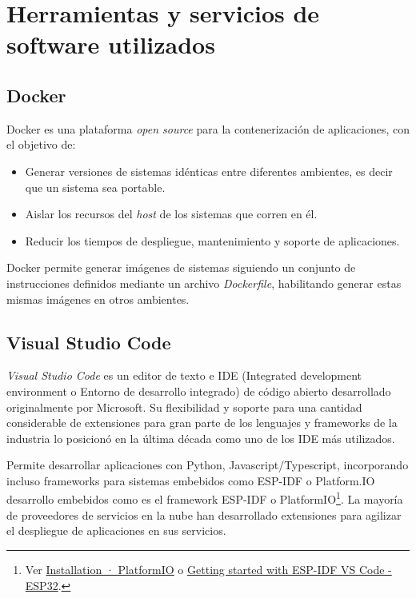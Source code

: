 \section{Herramientas y servicios de software utilizados}

\subsection{Docker}

Docker es una plataforma \textit{open source} para la contenerización de aplicaciones, con el objetivo de\citep{DOCKER:1}:
\begin{itemize}
	\item Generar versiones de sistemas idénticas entre diferentes ambientes, es decir que un sistema sea portable.
	\item Aislar los recursos del \textit{host} de los sistemas que corren en él.
	\item Reducir los tiempos de despliegue, mantenimiento y soporte de aplicaciones.
\end{itemize}

Docker permite generar imágenes de sistemas siguiendo un conjunto de instrucciones definidos mediante un archivo \textit{Dockerfile}, habilitando generar estas mismas imágenes en otros ambientes.

\subsection{Visual Studio Code}

\textit{Visual Studio Code} es un editor de texto e IDE (Integrated development environment o Entorno de desarrollo integrado) de código abierto desarrollado originalmente por Microsoft\citep{VSCODE:1}. Su flexibilidad y soporte para una cantidad considerable de extensiones para gran parte de los lenguajes y frameworks de la industria lo posicionó en la última década como uno de los IDE más utilizados.

Permite desarrollar aplicaciones con Python, Javascript/Typescript, incorporando incluso frameworks para sistemas embebidos como ESP-IDF o Platform.IO desarrollo embebidos como es el framework ESP-IDF o PlatformIO\footnote{Ver \href{https://platformio.org/install/ide?install=vscode}{Installation · PlatformIO} o \href{https://docs.espressif.com/projects/esp-idf/en/v4.2.3/esp32/get-started/vscode-setup.html}{Getting started with ESP-IDF VS Code - ESP32}.}. La mayoría de proveedores de servicios en la nube han desarrollado extensiones para agilizar el despliegue de aplicaciones en sus servicios.

